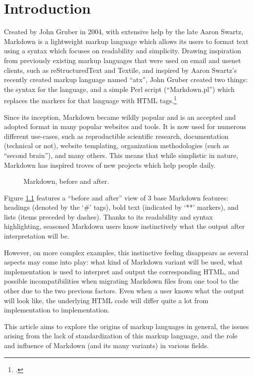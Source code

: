 \chapter{Introduction}
\label{chap:introduction}

\vspace{1cm}

Created by John Gruber in 2004, with extensive help by the late Aaron Swartz, Markdown is a lightweight markup language which allows its
users to format text using a syntax which focuses on readability and simplicity.
Drawing inspiration from previously existing markup languages that were used on email and usenet clients, such as reStructuredText and Textile,
and inspired by Aaron Swartz's recently created markup language named ``atx'', John Gruber created two things: the syntax for the language, and a simple
Perl script (``Markdown.pl'') which replaces the markers for that language with HTML tags.\footcite{gruber2004markdown}\newline

Since its inception, Markdown became wildly popular and is an accepted and adopted format in many popular websites and tools. It is now used for
numerous different use-cases, such as reproductible scientific research, documentation (technical or not), website templating, organization
methodologies (such as ``second brain''), and many others. This means that while simplistic in nature, Markdown has inspired troves of
new projects which help people daily.\newline

\begin{figure}[H]
    \hspace{-3cm}
    \qquad
    \caption{Markdown, before and after.}
    \label{fig:example-simple-syntax}
\end{figure}

Figure \ref{fig:example-simple-syntax} features a ``before and after'' view of 3 base Markdown features: headings (denoted by the `\#' tags),
bold text (indicated by `**' markers), and lists (items preceded by dashes). Thanks to its readability and syntax highlighting, seasoned
Markdown users know instinctively what the output after interpretation will be.\newline

However, on more complex examples, this instinctive feeling disappears as several aspects may come into play: what kind of Markdown variant will
be used, what implementation is used to interpret and output the corresponding HTML, and possible incompatibilities when migrating Markdown files
from one tool to the other due to the two previous factors. Even when a user knows what the output will look like, the underlying HTML code
will differ quite a lot from implementation to implementation.\newline

This article aims to explore the origins of markup languages in general, the issues arising from the lack of standardization of this markup language,
and the role and influence of Markdown (and its many variants) in various fields.